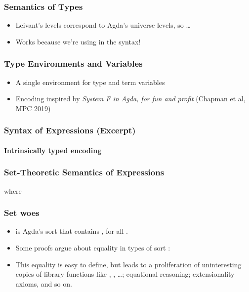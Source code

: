 \documentclass[dvipsnames,aspectratio=169,pdftex]{beamer}
\begin{document}
\begin{frame}
  \frametitle{Semantics of Types}
  \begin{itemize}
  \item Leivant's levels correspond to Agda's universe levels, so \dots
  \end{itemize}
  \pause
  \TFTEnvP
  \pause\vspace{-2\baselineskip}
  \TFTSemP
  \begin{itemize}
  \item Works because we're using  in the syntax!
  \end{itemize}
\end{frame}
\begin{frame}
  \frametitle{Type Environments and Variables}
  \begin{itemize}
  \item A single environment for type and term variables
  \item Encoding inspired by \emph{System F in Agda, for fun and profit} (Chapman et al, MPC 2019)
  \end{itemize}
  \TFTVEnv
  \pause\vspace{-2\baselineskip}
  \TFCleanerinn
\end{frame}
\begin{frame}
  \frametitle{Syntax of Expressions (Excerpt)}
  \framesubtitle{Intrinsically typed encoding}
  \TFCleanExpr
\end{frame}
\begin{frame}
  \frametitle{Set-Theoretic Semantics of Expressions}
  \TFExprSem
  where
  \TFVEnv
\end{frame}
\begin{frame}
  \frametitle{Set woes}
  \begin{itemize}
  \item {} is Agda's sort that contains , for all .
  \item Some proofs argue about equality in types of sort :
    \TFSingleSubstPreserves
  \item This equality is easy to define, but leads to a proliferation of uninteresting copies of library functions like , , \dots; equational reasoning; extensionality axioms, and so on.
  \end{itemize}
\end{frame}
\end{document}
